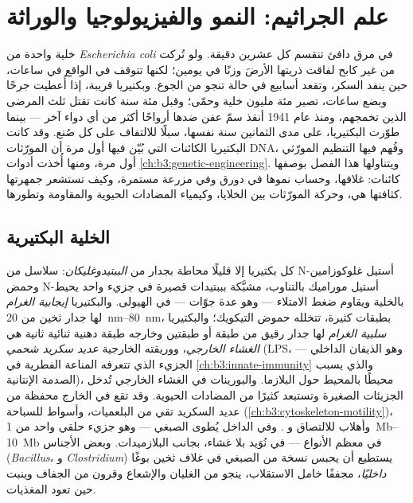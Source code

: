 \chapter{علم الجراثيم: النمو والفيزيولوجيا والوراثة}\label{ch:b3:bacteriology}

خلية واحدة من \emph{Escherichia coli} في مرق دافئ تنقسم كل
عشرين دقيقة. ولو تُركت من غير كابح لفاقت ذريتها الأرضَ
وزنًا في يومين؛ لكنها تتوقف في الواقع في ساعات، حين ينفد السكر،
وتقعد أسابيع في حالة تنجو من الجوع. وبكتيريا
قريبة، إذا أُعطيت جرحًا وبضع ساعات، تصير مئة مليون
خلية وحمّى؛ وقبل مئة سنة كانت تقتل ثلث
المرضى الذين تخمجهم، ومنذ عام 1941 أنقذ سمّ عفن ضدها
أرواحًا أكثر من أي دواء آخر --- بينما طوّرت البكتيريا، على مدى
الثمانين سنة نفسها، سبلًا للالتفاف على كل  صُنع.
وقد كانت البكتيريا الكائنات التي بُيّن فيها أول مرة أن المورّثات
DNA، وفُهم فيها التنظيم المورّثي أول مرة، ومنها أُخذت
أدوات \cref{ch:b3:genetic-engineering}. ويتناولها هذا الفصل
بوصفها كائنات: غلافها، وحساب نموها في دورق وفي
مزرعة مستمرة، وكيف تستشعر جمهرتها كثافتها هي،
وحركة المورّثات بين الخلايا، وكيمياء المضادات الحيوية والمقاومة وتطورها.

\section{الخلية البكتيرية}

\begin{definition}[الغلاف]\label{def:b3:bacteriology:envelope}
كل بكتيريا إلا قليلًا محاطة بجدار من \emph{الببتيدوغليكان}:
سلاسل من N-أستيل غلوكوزامين وحمض N-أستيل موراميك بالتناوب،
مشبَّكة بببتيدات قصيرة في جزيء واحد يحيط
بالخلية ويقاوم ضغط الامتلاء --- وهو عدة جوّات ---
في الهيولى. والبكتيريا \emph{إيجابية الغرام} لها جدار ثخين من
\qtyrange{20}{80}{nm}، بطبقات كثيرة، تتخلله حموض التيكويك؛
والبكتيريا \emph{سلبية الغرام} لها جدار رقيق من طبقة أو طبقتين
وخارجه طبقة دهنية ثنائية ثانية هي \emph{الغشاء الخارجي}،
ووريقته الخارجية \emph{عديد سكريد شحمي} (LPS، وهو الذيفان الداخلي ---
الجزيء الذي تتعرفه المناعة الفطرية في
\cref{ch:b3:innate-immunity} والذي يسبب الصدمة الإنتانية)،
محيطًا بالمحيط حول البلازما. والبورينات في الغشاء الخارجي تُدخل الجزيئات
الصغيرة وتستبعد كثيرًا من المضادات الحيوية. وقد تقع في الخارج محفظة من
عديد السكريد تقي من البلعميات، وأسواط للسباحة
(\cref{ch:b3:cytoskeleton-motility})، وأهلاب للالتصاق و
. وفي الداخل يُطوى الصبغي --- وهو جزيء حلقي واحد من
\qtyrange{1}{10}{Mb} في معظم الأنواع --- في نُوَيد
بلا غشاء، بجانب البلازميدات. وبعض الأجناس (\emph{Bacillus}، و
\emph{Clostridium}) يستطيع أن يحبس نسخة من الصبغي في غلاف
ثخين بوغًا \emph{داخليًا}، مجففًا خامل الاستقلاب، ينجو
من الغليان والإشعاع وقرون من الجفاف وينبت
حين تعود المغذيات.
\end{definition}

